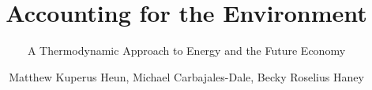 \documentclass[graybox,envcountchap,sectrefs]{svmono}
\begin{document}
\author{Matthew Kuperus Heun, Michael Carbajales-Dale, Becky Roselius Haney}
\title{Accounting for the Environment}
\subtitle{A Thermodynamic Approach to Energy and the Future Economy}
\maketitle{}

\glsaddall[types={nomenclature,glossary}]

\frontmatter%

%
%
%
%


\tableofcontents{}
\listoffigures{}
\listoftables{}


\printglossary[type=nomenclature, style=nomenclaturestyle, nonumberlist=true]

\setcounter{chapter}{-3}

{
	\renewcommand{\chaptermark}[1]{ \markboth{#1}{} }

	

	

	 

	
}


\mainmatter%

\end{document}

